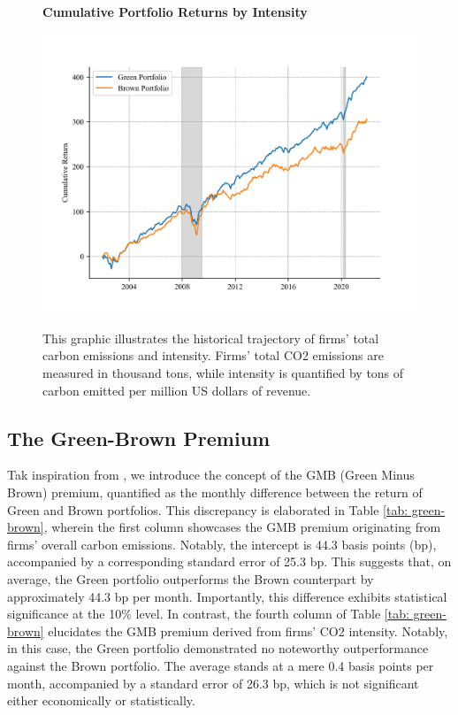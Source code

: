 \documentclass[12pt]{article}
\begin{document}
\begin{figure}[!ht]
\centering
\caption{\textbf{Cumulative Portfolio Returns by Intensity}}
\includegraphics{graphics/green_brown_int.png}
\label{fig: cum_ret_2}
\caption*{\footnotesize{This graphic illustrates the historical trajectory of firms' total carbon emissions and intensity. Firms' total CO2 emissions are measured in thousand tons, while intensity is quantified by tons of carbon emitted per million US dollars of revenue.}}
\end{figure}

\subsection{The Green-Brown Premium}


Tak inspiration from \cite{pastor2022dissecting}, we introduce the concept of the GMB (Green Minus Brown) premium, quantified as the monthly difference between the return of Green and Brown portfolios. This discrepancy is elaborated in Table \ref{tab: green-brown}, wherein the first column showcases the GMB premium originating from firms' overall carbon emissions. Notably, the intercept is 44.3 basis points (bp), accompanied by a corresponding standard error of 25.3 bp. This suggests that, on average, the Green portfolio outperforms the Brown counterpart by approximately 44.3 bp per month. Importantly, this difference exhibits statistical significance at the 10\% level. In contrast, the fourth column of Table \ref{tab: green-brown} elucidates the GMB premium derived from firms' CO2 intensity. Notably, in this case, the Green portfolio demonstrated no noteworthy outperformance against the Brown portfolio. The average stands at a mere 0.4 basis points per month, accompanied by a standard error of 26.3 bp, which is not significant either economically or statistically.
\end{document}
